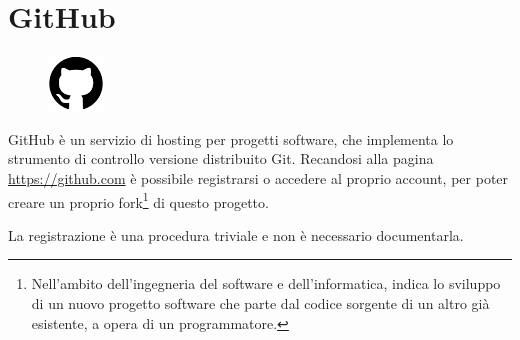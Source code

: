 \documentclass[envcountsame,envcountchap]{svmono}
\begin{document}
\section{GitHub}
\label{wrapfigure}
\begin{figure}
    \centering
    \vspace{-0.5\linewidth} %
    \includegraphics[width=\linewidth]{images/github/github.png}
    \vspace{-0.9\linewidth} %
    \label{logo_github}
\end{figure}

GitHub è un servizio di hosting per progetti software, che implementa lo strumento 
di controllo versione distribuito Git.
Recandosi alla pagina \url{https://github.com} è possibile registrarsi o accedere al 
proprio account, per poter creare un proprio fork\footnote{Nell'ambito dell'ingegneria
\label{nota_pie_pagina}
del software e dell'informatica, indica lo sviluppo di un nuovo progetto software che
parte dal codice sorgente di un altro già esistente, a opera di 
un programmatore.} di questo progetto.

La registrazione è una procedura triviale e non è necessario documentarla.
\end{document}
